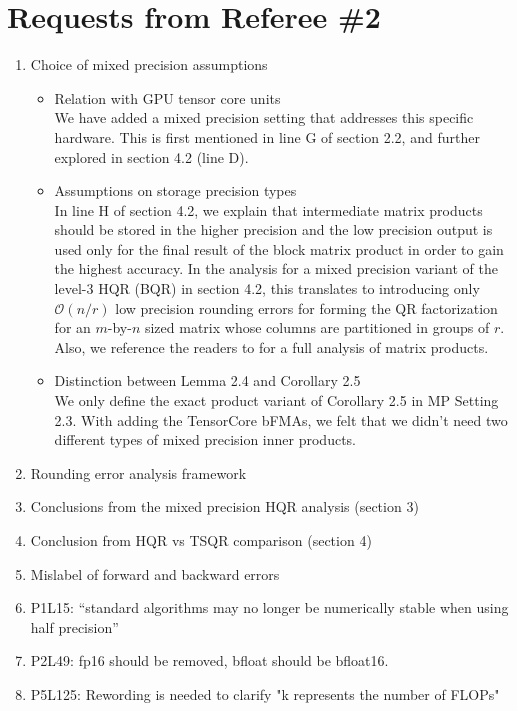 \documentclass[10pt]{article}
\newcommand{\cO}{\mathcal{O}}
\begin{document}
\section*{Requests from Referee \#2}
\begin{enumerate}\bfseries
	\item Choice of mixed precision assumptions
	\begin{itemize}
		\item Relation with GPU tensor core units\\
		{\normalfont We have added a mixed precision setting that addresses this specific hardware.
		This is first mentioned in line G of section 2.2, and further explored in section 4.2 (line D).	
	}
		\item Assumptions on storage precision types\\
		{\normalfont In line H of section 4.2, we explain that  intermediate matrix products should be stored in the higher precision and the low precision output is used only for the final result of the block matrix product in order to gain the highest accuracy.
		In the analysis for a mixed precision variant of the level-3 HQR (BQR) in section 4.2, this translates to introducing only $\cO(n/r)$ low precision rounding errors for forming the QR factorization for an $m$-by-$n$ sized matrix whose columns are partitioned in groups of $r$.
		Also, we reference the readers to \cite{Blanchard2019} for a full analysis of matrix products. 
		}
		\item Distinction between Lemma 2.4 and Corollary 2.5\\
		{\normalfont 
		We only define the exact product variant of Corollary 2.5 in MP Setting 2.3. 
		With adding the TensorCore bFMAs, we felt that we didn't need two different types of mixed precision inner products. 
		}
	\end{itemize}
	\item Rounding error analysis framework
	\item Conclusions from the mixed precision HQR analysis (section 3)
	\item Conclusion from HQR vs TSQR comparison (section 4)
	\item Mislabel of forward and backward errors
	\item P1L15: ``standard algorithms may no longer be numerically stable when using half precision''
	\item P2L49: fp16 should be removed, bfloat should be bfloat16.
	\item P5L125: Rewording is needed to clarify "k represents the number of FLOPs" 

\end{enumerate}
\end{document}
